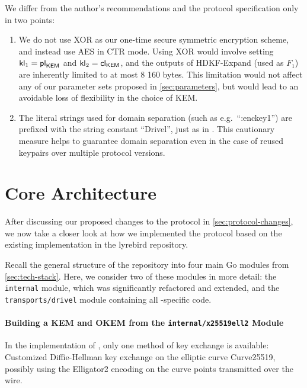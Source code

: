We differ from the author's recommendations and the protocol specification only in two points:
\begin{enumerate}
    \item We do not use XOR as our one-time secure symmetric encryption scheme, and instead use AES in CTR mode. Using XOR would involve setting $\mathsf{kl}_1 = {\mathsf{pl}_{\mathsf{KEM}}}$ and $\mathsf{kl}_2 = {\mathsf{cl}_{\mathsf{KEM}}}$, and the outputs of \textsf{HDKF-Expand} (used as $F_1$) are inherently limited to at most 8 160 bytes. This limitation would not affect any of our parameter sets proposed in \cref{sec:parameters}, but would lead to an avoidable loss of flexibility in the choice of KEM.

    \item The literal strings used for domain separation (such as e.g.~``:enckey1'') are prefixed with the string constant ``Drivel'', just as in \obfsfour{}. This cautionary measure helps to guarantee domain separation even in the case of reused keypairs over multiple protocol versions.
\end{enumerate}

\section{Core Architecture} \label{sec:impl-architecture}

After discussing our proposed changes to the \drivel{} protocol in \cref{sec:protocol-changes}, we now take a closer look at how we implemented the \drivel{} protocol based on the existing \obfsfour{} implementation in the lyrebird repository.

Recall the general structure of the repository into four main Go modules from \cref{sec:tech-stack}. Here, we consider two of these modules in more detail: the \texttt{internal} module, which was significantly refactored and extended, and the \texttt{transports/drivel} module containing all \drivel{}-specific code.

\paragraph{Building a KEM and OKEM from the \texttt{internal/x25519ell2} Module}

In the implementation of \obfsfour{}, only one method of key exchange is available: Customized Diffie-Hellman key exchange on the elliptic curve Curve25519, possibly using the \textsf{Elligator2} encoding on the curve points transmitted over the wire.

